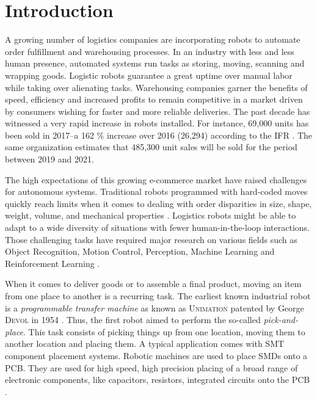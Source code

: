 \documentclass[/home/francois/latex/report/main.tex]{subfiles}
\begin{document}
\chapter{Introduction}
\label{chapter:introduction}

A growing number of logistics companies are incorporating robots to automate order fulfillment and warehousing processes. In an industry with less and less human presence, automated systems run tasks as storing, moving, scanning and wrapping goods. Logistic robots guarantee a great uptime over manual labor while taking over alienating tasks. Warehousing companies garner the benefits of speed, efficiency and increased profits to remain competitive in a market driven by consumers wishing for faster and more reliable deliveries. The past decade has witnessed a very rapid increase in robots installed. For instance, 69,000 units has been sold in 2017–a 162 \% increase over 2016 (26,294) according to the \ac{IFR} \cite{industrialRobot2018}. The same organization estimates that 485,300 unit sales will be sold for the period between 2019 and 2021.

The high expectations of this growing e-commerce market have raised challenges for autonomous systems. Traditional robots programmed with hard-coded moves quickly reach limits when it comes to dealing with order disparities in size, shape, weight, volume, and mechanical properties \cite{GQHuang2015}. Logistics robots might be able to adapt to a wide diversity of situations with fewer human-in-the-loop interactions. Those challenging tasks have required major research on various fields such as Object Recognition, Motion Control, Perception, Machine Learning and Reinforcement Learning \cite{Kaung2019}.

When it comes to deliver goods or to assemble a final product, moving an item from one place to another is a recurring task. The earliest known industrial robot is a \textit{programmable transfer machine} as known as \textsc{Unimation} patented by George \textsc{Devol} in 1954 \cite{Wallen2008}. Thus, the first robot aimed to perform the so-called \textit{pick-and-place}. This task consists of picking things up from one location, moving them to another location and placing them. A typical application comes with \ac{SMT} component placement systems. Robotic machines are used to place \ac{SMDs} onto a \ac{PCB}. They are used for high speed, high precision placing of a broad range of electronic components, like capacitors, resistors, integrated circuits onto the \ac{PCB} \cite{Ho2009}.
\end{document}
